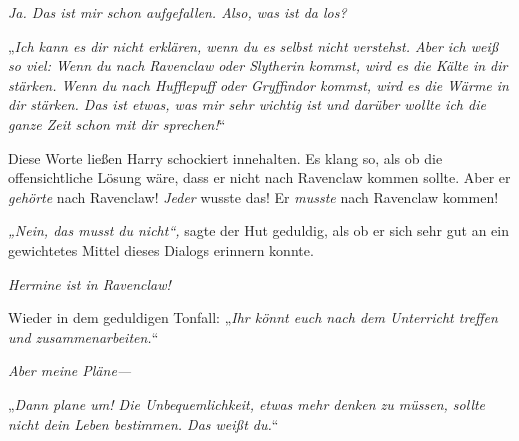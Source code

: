 \emph{Ja. Das ist mir schon aufgefallen. Also, was ist da los? }

„\emph{Ich kann es dir nicht erklären, wenn du es selbst nicht verstehst. Aber ich weiß so viel: Wenn du nach Ravenclaw oder Slytherin kommst, wird es die Kälte in dir stärken. Wenn du nach Hufflepuff oder Gryffindor kommst, wird es die Wärme in dir stärken. Das ist etwas, was mir sehr wichtig ist und darüber wollte ich die ganze Zeit schon mit dir sprechen!}“

Diese Worte ließen Harry schockiert innehalten. Es klang so, als ob die offensichtliche Lösung wäre, dass er nicht nach Ravenclaw kommen sollte. Aber er \emph{gehörte} nach Ravenclaw! \emph{Jeder} wusste das! Er \emph{musste} nach Ravenclaw kommen!

\emph{„Nein, das musst du nicht“,} sagte der Hut geduldig, als ob er sich sehr gut an ein gewichtetes Mittel dieses Dialogs erinnern konnte.

\emph{Hermine ist in Ravenclaw!}

Wieder in dem geduldigen Tonfall: „\emph{Ihr könnt euch nach dem Unterricht treffen und zusammenarbeiten.}“

\emph{Aber meine Pläne—}

„\emph{Dann plane um! Die Unbequemlichkeit, etwas mehr denken zu müssen, sollte nicht dein Leben bestimmen. Das \emph{weißt} du.}“

